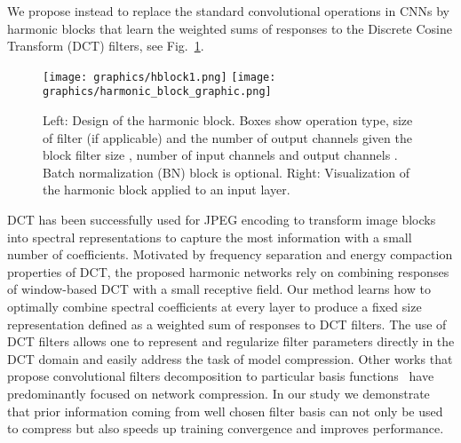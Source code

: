 \documentclass[12pt,a4paper]{article}
\begin{document}
We propose instead to replace the standard convolutional operations in CNNs by harmonic blocks that learn the weighted sums of responses to the Discrete Cosine Transform (DCT) filters, see Fig.~\ref{fig:harmlayer}.
\begin{figure}[!h]
\begin{center}
\begin{center}
   \texttt{[image: graphics/hblock1.png]}
   \texttt{[image: graphics/harmonic\_block\_graphic.png]}
\end{center}
\end{center}
\vspace{-.5\baselineskip}
\caption{Left: Design of the harmonic block. 
Boxes show operation type, size of filter (if applicable) and the number of output channels given the block filter size , number of input channels  and output channels . Batch normalization (BN) block is optional. Right: Visualization of the harmonic block applied to an input layer.}
\label{fig:harmlayer}
\end{figure}
DCT has been successfully used for JPEG encoding to transform image blocks into spectral representations to capture the most information with a small number of coefficients.
Motivated by frequency separation and energy compaction properties of DCT, the proposed harmonic networks rely on combining responses of window-based DCT with a small receptive field.
Our method learns how to optimally combine spectral coefficients at every layer to produce a fixed size representation defined as a weighted sum of responses to DCT filters. The use of DCT filters allows one to represent and regularize filter parameters directly in the DCT domain and easily address the task of model compression.
Other works that propose convolutional filters decomposition to particular basis functions~\cite{Qiu18,Tayyab19} have predominantly focused on network compression. In our study we demonstrate that prior information coming from well chosen filter basis can not only be used to compress but also speeds up training convergence and improves performance.
\end{document}
